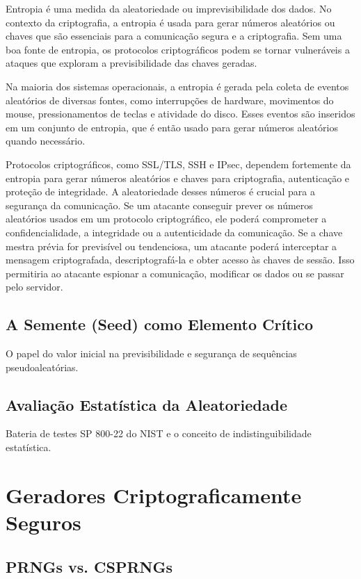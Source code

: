 \documentclass[
	12pt,				%
	openright,			%
	oneside,			%
	a4paper,			%
	portuguese,			%
	brazil				%
	]{abntex2}
\begin{document}
Entropia é uma medida da aleatoriedade ou imprevisibilidade dos dados. 
No contexto da criptografia, a entropia é usada para gerar 
números aleatórios ou chaves que são essenciais para a comunicação segura e a criptografia. 
Sem uma boa fonte de entropia, os protocolos criptográficos podem se tornar vulneráveis a ataques 
que exploram a previsibilidade das chaves geradas.

Na maioria dos sistemas operacionais, 
a entropia é gerada pela coleta de eventos aleatórios de diversas fontes, 
como interrupções de hardware, movimentos do mouse, 
pressionamentos de teclas e atividade do disco. 
Esses eventos são inseridos em um conjunto de entropia, 
que é então usado para gerar números aleatórios quando necessário.

Protocolos criptográficos, como SSL/TLS, SSH e IPsec, 
dependem fortemente da entropia para gerar números aleatórios e chaves para criptografia, 
autenticação e proteção de integridade.
A aleatoriedade desses números é crucial para a segurança da comunicação. 
Se um atacante conseguir prever os números aleatórios usados em um protocolo criptográfico, 
ele poderá comprometer a confidencialidade, a integridade ou a autenticidade da comunicação.
Se a chave mestra prévia for previsível ou tendenciosa, 
um atacante poderá interceptar a mensagem criptografada, 
descriptografá-la e obter acesso às chaves de sessão. 
Isso permitiria ao atacante espionar a comunicação, 
modificar os dados ou se passar pelo servidor.\cite{6.2Entropia}

\section{A Semente (Seed) como Elemento Crítico}

O papel do valor inicial na previsibilidade e segurança de sequências pseudoaleatórias.

\section{Avaliação Estatística da Aleatoriedade}

Bateria de testes SP 800-22 do NIST e o conceito de indistinguibilidade estatística.

\chapter{Geradores Criptograficamente Seguros} %

\section{PRNGs vs. CSPRNGs}
\end{document}

